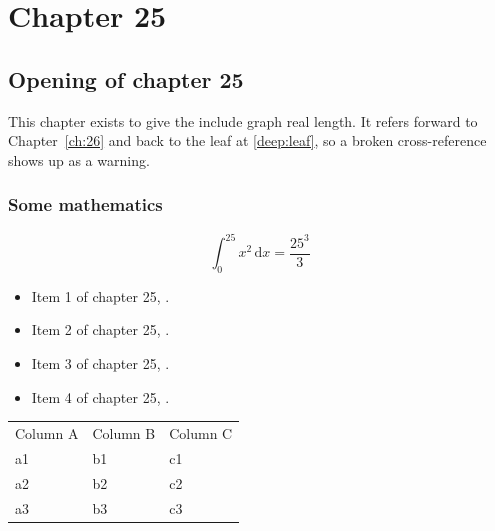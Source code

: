 \chapter{Chapter 25}
\label{ch:25}
\section{Opening of chapter 25}
This chapter exists to give the include graph real length. It refers
forward to Chapter~\ref{ch:26} and back to the leaf
at \ref{deep:leaf}, so a broken cross-reference shows up as a warning.

\subsection{Some mathematics}
\begin{equation}
  \int_0^{25} x^{2} \, \mathrm{d}x = \frac{25^{3}}{3}
\end{equation}

\begin{itemize}
  \item Item 1 of chapter 25, .
  \item Item 2 of chapter 25, .
  \item Item 3 of chapter 25, .
  \item Item 4 of chapter 25, .
\end{itemize}

\begin{tabular}{lll}
  Column A & Column B & Column C \\
  a1 & b1 & c1 \\
  a2 & b2 & c2 \\
  a3 & b3 & c3 \\
\end{tabular}
